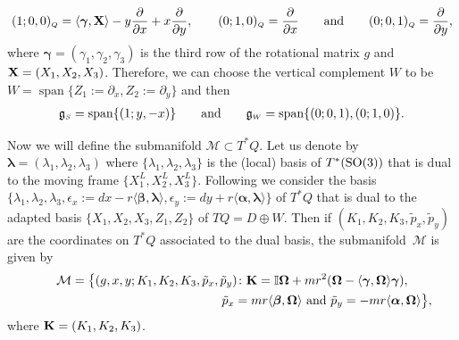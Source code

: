 \documentclass[10pt,a4paper]{amsart}
\numberwithin{equation}{section}
\def\M{\mathcal{M}}
\def\g{\mathfrak{g}}
\def\subSS{{\mbox{\tiny{$S$}}}}
\def\subWW{{\mbox{\tiny{$W$}}}}
\def\subQQ{{\mbox{\tiny{$Q$}}}}
\def\vecOm{\boldsymbol{\Omega}}
\newcommand{\SO}{{\rm SO}}
\def\vecL{\boldsymbol{\lambda}}
\def\vecgamma{\boldsymbol{\gamma}}
\def\vecalpha{\boldsymbol{\alpha}}
\def\vecbeta{\boldsymbol{\beta}}
\begin{document}
\begin{gather*}
(1;0,0)_\subQQ = \langle \vecgamma, {\bf X} \rangle -y\frac{\partial}{\partial x} + x\frac{\partial}{\partial y}, \qquad (0;1,0)_\subQQ = \frac{\partial}{\partial x} \qquad \mbox{and} \qquad (0;0,1)_\subQQ = \frac{\partial}{\partial y},
\end{gather*}
where $\vecgamma = (\gamma_1, \gamma_2, \gamma_3)$ is the third row of the rotational matrix $g$ and ${\bf X} = (X_1,X_2, X_3)$.
Therefore, we can choose the vertical complement $W$ to be $W=\operatorname{span}\{Z_1:=\partial_x, Z_2:= \partial_y\}$ and then
\begin{gather*}
\g_\subSS = \operatorname{span}\{(1;y,-x)\} \qquad \mbox{and} \qquad \g_\subWW =\operatorname{span}\{(0;0,1), (0;1,0) \}.
\end{gather*}

Now we will def\/ine the submanifold $\M\subset T^*Q$. Let us denote by $\vecL = (\lambda_1, \lambda_2, \lambda_3)$ where $\{\lambda_1, \lambda_2, \lambda_3\}$ is the (local) basis of $T^*(\SO(3))$ that is dual to the moving frame $\{X_1^L, X_2^L, X_3^L\}$.  Following \cite{Paula, Luis} we consider the basis $\{\lambda_1, \lambda_2, \lambda_3, \epsilon_x := dx - r \langle \vecbeta,\vecL \rangle , \epsilon_y := dy + r \langle \vecalpha,\vecL \rangle \}$ of $T^*Q$ that is dual to the adapted basis $\{X_1, X_2, X_3 ,Z_1, Z_2\}$ of $TQ = D\oplus W$. Then if $(K_1, K_2, K_3, \tilde p_x, \tilde p_y)$ are the coordinates on $T^*Q$ associated to the dual basis, the submanifold~$\M$ is given by
\begin{gather*}
\M = \big\{ (g,x,y; K_1, K_2, K_3, \tilde p_x, \tilde p_y) \colon {\bf K} = \mathbb{I}\vecOm + mr^2 (\vecOm - \langle \vecgamma, \vecOm \rangle \vecgamma ), \\
\hphantom{\M = \big\{ (g,x,y; K_1, K_2, K_3, \tilde p_x, \tilde p_y) \colon}{} \tilde p_x = mr \langle \vecbeta,\vecOm\rangle \  \mbox{and} \  \tilde p_y = - mr \langle \vecalpha, \vecOm\rangle  \big\} ,
\end{gather*}
where ${\bf K} = ( K_1, K_2, K_3)$.
\end{document}
